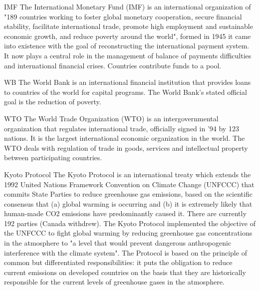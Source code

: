 \begin{sortEnvironment}{IMF}
The International Monetary Fund (IMF) is an international organization of "189 countries working to foster global monetary cooperation, secure financial stability, facilitate international trade, promote high employment and sustainable economic growth, and reduce poverty around the world", formed in 1945 it came into existence with the goal of reconstructing the international payment system. It now plays a central role in the management of balance of payments difficulties and international financial crises. Countries contribute funds to a pool. 
\end{sortEnvironment}

\begin{sortEnvironment}{WB}
The World Bank is an international financial institution that provides loans to countries of the world for capital programs. The World Bank's stated official goal is the reduction of poverty. 
\end{sortEnvironment}

\begin{sortEnvironment}{WTO}
The World Trade Organization (WTO) is an intergovernmental organization that regulates international trade, officially signed in '94 by 123 nations. It is the largest international economic organization in the world. The WTO deals with regulation of trade in goods, services and intellectual property between participating countries.
\end{sortEnvironment}

\begin{sortEnvironment}{Kyoto Protocol}
The Kyoto Protocol is an international treaty which extends the 1992 United Nations Framework Convention on Climate Change (UNFCCC) that commits State Parties to reduce greenhouse gas emissions, based on the scientific consensus that (a) global warming is occurring and (b) it is extremely likely that human-made CO2 emissions have predominantly caused it. There are currently 192 parties (Canada withdrew). The Kyoto Protocol implemented the objective of the UNFCCC to fight global warming by reducing greenhouse gas concentrations in the atmosphere to "a level that would prevent dangerous anthropogenic interference with the climate system". The Protocol is based on the principle of common but differentiated responsibilities: it puts the obligation to reduce current emissions on developed countries on the basis that they are historically responsible for the current levels of greenhouse gases in the atmosphere.
\end{sortEnvironment}

